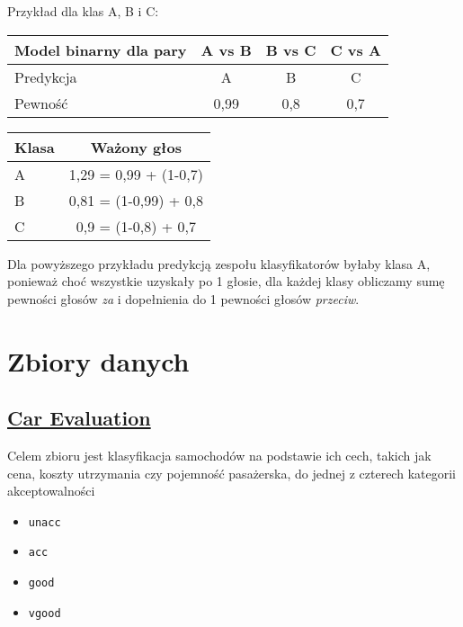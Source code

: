 \documentclass{article}
\begin{document}
Przykład dla klas A, B i C:

\begin{table}[ht]
\centering
\begin{tabular}{|l|c|c|c|}
\hline
Model binarny dla pary & A vs B & B vs C & C vs A \\ \hline
Predykcja              & A      & B      & C      \\
Pewność                & 0,99   & 0,8    & 0,7    \\ \hline
\end{tabular}
\label{tab:binary-pairs}
\end{table}

\begin{table}[ht]
\centering
\begin{tabular}{|l|c|}
\hline
Klasa & Ważony głos \\ \hline
A     & 1,29 = 0,99 + (1-0,7) \\
B     & 0,81 = (1-0,99) + 0,8 \\
C     & 0,9 = (1-0,8) + 0,7 \\ \hline
\end{tabular}
\label{tab:weighted-votes}
\end{table}

Dla powyższego przykładu predykcją zespołu klasyfikatorów byłaby klasa A, ponieważ choć wszystkie uzyskały po 1 głosie,
dla każdej klasy obliczamy sumę pewności głosów \textit{za} i dopełnienia do 1 pewności głosów \textit{przeciw}.

\section{Zbiory danych}


\subsection{\href{https://archive.ics.uci.edu/dataset/19/car+evaluation}{Car Evaluation}}



Celem zbioru jest klasyfikacja samochodów na podstawie ich cech, takich jak cena, koszty utrzymania czy pojemność pasażerska, do jednej z czterech kategorii akceptowalności

\begin{itemize}
    \item \texttt{unacc}
    \item \texttt{acc}
    \item \texttt{good}
    \item \texttt{vgood}
\end{itemize}
\end{document}
